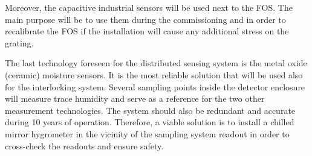 Moreover, the capacitive industrial sensors will be used next to the \gls{FOS}. The main purpose will be to use them during the commissioning and in order to recalibrate the \gls{FOS} if the installation will cause any additional stress on the grating.

The last technology foreseen for the distributed sensing system is the metal oxide (ceramic) moisture sensors. It is the most reliable solution that will be used also for the interlocking system. Several sampling points inside the detector enclosure will measure trace humidity and serve as a reference for the two other measurement technologies. The system should also be redundant and accurate during 10 years of operation. Therefore, a viable solution is to install a chilled mirror hygrometer in the vicinity of the sampling system readout in order to cross-check the readouts and ensure safety. 